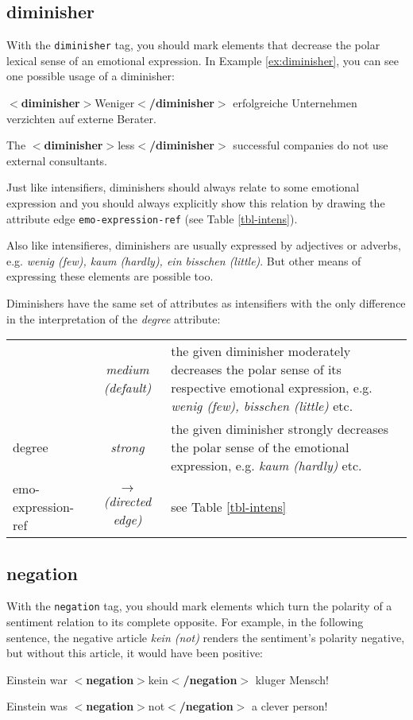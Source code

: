 \documentclass[11pt,a4paper]{article}
\newcommand{\xmltag}[1]{{\textbf{\small$<$#1$>$}}}
\newcommand{\diminisher}[1]{\xmltag{diminisher}#1\xmltag{/diminisher}}
\newcommand{\negation}[1]{\xmltag{negation}#1\xmltag{/negation}}
\newlength\clmnwidth
\newenvironment{myexe}{
  \begin{exe}
    \ex\begin{center}
    \itshape
}{
    \end{center}
  \end{exe}
}
\begin{document}
\subsection{diminisher}
With the \texttt{diminisher} tag, you should mark elements that
decrease the polar lexical sense of an emotional expression.  In
Example \ref{ex:diminisher}, you can see one possible usage of a
diminisher:
\begin{myexe}
  \diminisher{Weniger} erfolgreiche Unternehmen verzichten auf externe
  Berater.\label{ex:diminisher}

  The \diminisher{less} successful companies do not use external
  consultants.
\end{myexe}
Just like intensifiers, diminishers should always relate to some emotional
expression and you should always explicitly show this relation by drawing the
attribute edge \texttt{emo-expression-ref} (see Table \ref{tbl-intens}).

Also like intensifieres, diminishers are usually expressed by
adjectives or adverbs, e.g. \textit{wenig (few), kaum (hardly), ein
  bisschen (little)}.  But other means of expressing these elements
are possible too.

Diminishers have the same set of attributes as intensifiers with the only
difference in the interpretation of the \textit{degree} attribute:
\begin{center}
  \begin{tabular}{|l|c|p{\clmnwidth}|}\hline\label{tbl-dimin}

    & \textit{medium (default)} & the given diminisher moderately
    decreases the polar sense of its respective emotional expression,
    e.g. \textit{wenig (few), bisschen (little)} etc.\\\cline{2-3}

    \multirow{-2}{*}{degree} & \textit{strong} & the given diminisher
    strongly decreases the polar sense of the emotional expression,
    e.g. \textit{kaum (hardly)} etc.\\\hline

    emo-expression-ref & \textit{$\longrightarrow$\newline(directed
      edge)} & see Table \ref{tbl-intens}\\\hline
  \end{tabular}
\end{center}

\subsection{negation}
With the \texttt{negation} tag, you should mark elements which turn
the polarity of a sentiment relation to its complete opposite.  For
example, in the following sentence, the negative article \textit{kein
  (not)} renders the sentiment's polarity negative, but without this
article, it would have been positive:
\begin{myexe}
Einstein war \negation{kein} kluger Mensch!\label{ex:negation}

Einstein was \negation{not} a clever person!
\end{myexe}
\end{document}
